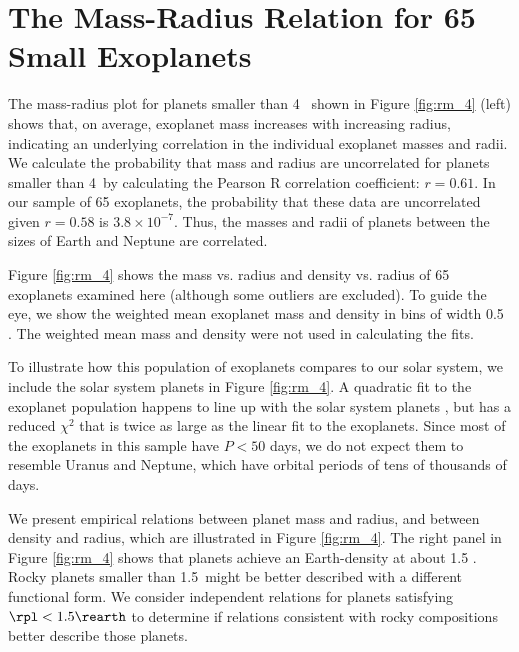 \section{The Mass-Radius Relation for 65 Small Exoplanets}
The mass-radius plot for planets smaller than 4 \rearth\ shown in Figure \ref{fig:rm_4} (left) shows that, on average, exoplanet mass increases with increasing radius, indicating an underlying correlation in the individual exoplanet masses and radii.  We calculate the probability that mass and radius are uncorrelated for planets smaller than 4\rearth\ by calculating the Pearson R correlation coefficient: $r=0.61$.  In our sample of 65 exoplanets, the probability that these data are uncorrelated given $r = 0.58$ is $3.8 \times 10^{-7}$.  Thus, the masses and radii of planets between the sizes of Earth and Neptune are correlated.

Figure \ref{fig:rm_4} shows the mass vs. radius and density vs. radius of 65 exoplanets examined here (although some outliers are excluded).  To guide the eye, we show the weighted mean exoplanet mass and density in bins of width 0.5 \rearth.  The weighted mean mass and density were not used in calculating the fits.

To illustrate how this population of exoplanets compares to our solar system, we include the solar system planets in Figure \ref{fig:rm_4}.  A quadratic fit to the exoplanet population happens to line up with the solar system planets \citep{Lissauer2011}, but has a reduced $\chi^2$ that is twice as large as the linear fit to the exoplanets.  Since most of the exoplanets in this sample have $P < 50$ days, we do not expect them to resemble Uranus and Neptune, which have orbital periods of tens of thousands of days.

We present empirical relations between planet mass and radius, and between density and radius, which are illustrated in Figure \ref{fig:rm_4}.  The right panel in Figure \ref{fig:rm_4} shows that planets achieve an Earth-density at about 1.5 \rearth.  Rocky planets smaller than 1.5\rearth\ might be better described with a different functional form.  We consider independent relations for planets satisfying $\rpl < 1.5 \rearth$ to determine if relations consistent with rocky compositions better describe those planets.

